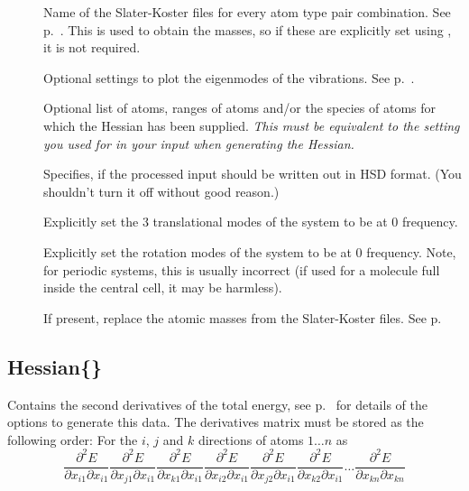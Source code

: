 \begin{description}
\item[] Name of the Slater-Koster files for
  every atom type pair combination. See
  p.~. This is used to obtain the
  masses, so if these are explicitly set using , it is
  not required.
\item[] Optional settings to plot the eigenmodes of the
  vibrations. See p.~.
\item[] Optional list of atoms, ranges of atoms and/or the species of
  atoms for which the Hessian has been supplied. \emph{This must be equivalent
    to the setting you used for  in your \dftbp{} input when
    generating the Hessian.}
\item[] Specifies, if the processed input should be written
  out in HSD format. (You shouldn't turn it off without good reason.)
\item[] Explicitly set the 3 translational modes of the
  system to be at 0 frequency.
\item[] Explicitly set the rotation modes of the system to be
  at 0 frequency. Note, for periodic systems, this is usually incorrect (if used
  for a molecule full inside the central cell, it may be harmless).
\item[] If present, replace the atomic masses from the Slater-Koster files. See
  p.~
\end{description}


\subsection{Hessian\{\}}
\label{sec:modes.Hessian}

Contains the second derivatives of the total energy,
see p.~ for details of the \dftbp{}
options to generate this data. The derivatives matrix must be stored
as the following order: For the $i$, $j$ and $k$ directions of atoms
$1 \ldots n$ as
\begin{equation*}
  \frac{\partial^2 E}{\partial x_{i1} \partial x_{i1}} \frac{\partial^2
    E}{\partial x_{j1} \partial x_{i1}} \frac{\partial^2 E}{\partial x_{k1}
    \partial x_{i1}} \frac{\partial^2 E}{\partial x_{i2} \partial x_{i1}}
  \frac{\partial^2 E}{\partial x_{j2} \partial x_{i1}} \frac{\partial^2
    E}{\partial x_{k2} \partial x_{i1}} \ldots \frac{\partial^2 E}{\partial
    x_{kn} \partial x_{kn}}
\end{equation*}

